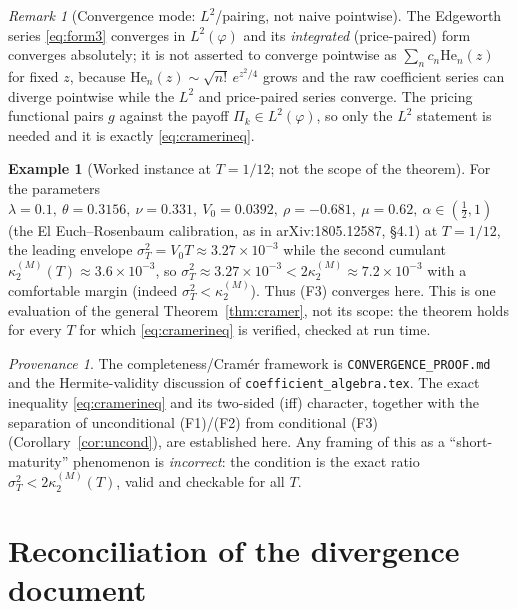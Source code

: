 \documentclass[11pt]{article}
\newcommand{\Herm}{\mathrm{He}}
\theoremstyle{plain}
\theoremstyle{definition}
\newtheorem{example}[theorem]{Example}
\theoremstyle{remark}
\newtheorem*{provenance}{Provenance}
\newtheorem*{remarknote}{Remark}
\begin{document}
\begin{remarknote}[Convergence mode: $L^2$/pairing, not naive pointwise]
The Edgeworth series \eqref{eq:form3} converges in $L^2(\varphi)$ and its
\emph{integrated} (price-paired) form converges absolutely; it is not asserted to
converge pointwise as $\sum_n c_n\Herm_n(z)$ for fixed $z$, because
$\Herm_n(z)\sim\sqrt{n!}\,e^{z^2/4}$ grows and the raw coefficient series can
diverge pointwise while the $L^2$ and price-paired series converge. The pricing
functional pairs $g$ against the payoff $\Pi_k\in L^2(\varphi)$, so only the
$L^2$ statement is needed and it is exactly \eqref{eq:cramerineq}.
\end{remarknote}

\begin{example}[Worked instance at $T=1/12$; not the scope of the theorem]
\label{ex:instance}
For the parameters $\lambda=0.1,\ \theta=0.3156,\ \nu=0.331,\ V_0=0.0392,\
\rho=-0.681,\ \mu=0.62,\ \alpha\in(\tfrac12,1)$ (the El Euch--Rosenbaum
calibration, as in arXiv:1805.12587, \S4.1) at
$T=1/12$, the leading envelope $\sigma_T^2=V_0T\approx3.27\times10^{-3}$ while the
second cumulant $\kappa_2^{(M)}(T)\approx3.6\times10^{-3}$, so
$\sigma_T^2\approx3.27\times10^{-3}<2\kappa_2^{(M)}\approx7.2\times10^{-3}$ with a
comfortable margin (indeed $\sigma_T^2<\kappa_2^{(M)}$). Thus \textup{(F3)}
converges here. This is one evaluation of the general
Theorem~\ref{thm:cramer}, not its scope: the theorem holds for every $T$ for which
\eqref{eq:cramerineq} is verified, checked at run time.
\end{example}

\begin{provenance}
The completeness/Cramér framework is \texttt{CONVERGENCE\_PROOF.md} and the
Hermite-validity discussion of \texttt{coefficient\_algebra.tex}. The exact
inequality \eqref{eq:cramerineq} and its two-sided (iff) character, together with
the separation of unconditional \textup{(F1)}/\textup{(F2)} from conditional
\textup{(F3)} (Corollary~\ref{cor:uncond}), are established here. Any framing of
this as a ``short-maturity'' phenomenon is \emph{incorrect}: the condition is the
exact ratio $\sigma_T^2<2\kappa_2^{(M)}(T)$, valid and checkable for all $T$.
\end{provenance}

\section{Reconciliation of the divergence document}
\label{sec:divergence}
\end{document}
